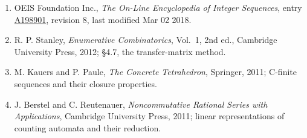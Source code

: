 \documentclass[11pt]{article}
\theoremstyle{definition}
\begin{document}
\begin{enumerate}

\item OEIS Foundation Inc., \emph{The On-Line Encyclopedia of Integer Sequences}, entry \href{https://oeis.org/A198901}{A198901}, revision 8, last modified Mar 02 2018.

\item R. P. Stanley, \emph{Enumerative Combinatorics}, Vol.~1, 2nd ed., Cambridge University Press, 2012; \S4.7, the transfer-matrix method.

\item M. Kauers and P. Paule, \emph{The Concrete Tetrahedron}, Springer, 2011; C-finite sequences and their closure properties.

\item J. Berstel and C. Reutenauer, \emph{Noncommutative Rational Series with Applications}, Cambridge University Press, 2011; linear representations of counting automata and their reduction.

\end{enumerate}
\end{document}
